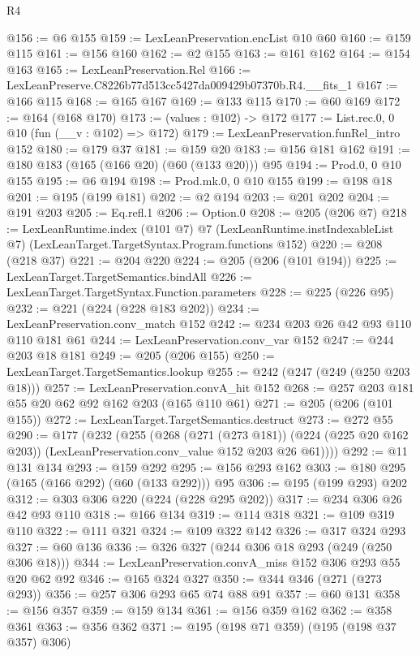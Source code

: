 \begin{lexlean}{R4}
\begin{coremodule}
@156 := @6 @155
@159 := LexLeanPreservation.encList @10 @60
@160 := @159 @115
@161 := @156 @160
@162 := @2 @155
@163 := @161 @162
@164 := @154 @163
@165 := LexLeanPreservation.Rel
@166 := LexLeanPreserve.C8226b77d513cc5427da009429b07370b.R4.__fits_1
@167 := @166 @115
@168 := @165 @167
@169 := @133 @115
@170 := @60 @169
@172 := @164 (@168 @170)
@173 := (values : @102) -> @172
@177 := List.rec.{0, 0} @10 (fun (__v : @102) => @172)
@179 := LexLeanPreservation.funRel_intro @152
@180 := @179 @37
@181 := @159 @20
@183 := @156 @181 @162
@191 := @180 @183 (@165 (@166 @20) (@60 (@133 @20))) @95
@194 := Prod.{0, 0} @10 @155
@195 := @6 @194
@198 := Prod.mk.{0, 0} @10 @155
@199 := @198 @18
@201 := @195 (@199 @181)
@202 := @2 @194
@203 := @201 @202
@204 := @191 @203
@205 := Eq.refl.{1}
@206 := Option.{0}
@208 := @205 (@206 @7)
@218 := LexLeanRuntime.index
    (@101 @7)
    @7
    (LexLeanRuntime.instIndexableList @7)
    (LexLeanTarget.TargetSyntax.Program.functions @152)
@220 := @208 (@218 @37)
@221 := @204 @220
@224 := @205 (@206 (@101 @194))
@225 := LexLeanTarget.TargetSemantics.bindAll
@226 := LexLeanTarget.TargetSyntax.Function.parameters
@228 := @225 (@226 @95)
@232 := @221 (@224 (@228 @183 @202))
@234 := LexLeanPreservation.conv_match @152
@242 := @234 @203 @26 @42 @93 @110 @110 @181 @61
@244 := LexLeanPreservation.conv_var @152
@247 := @244 @203 @18 @181
@249 := @205 (@206 @155)
@250 := LexLeanTarget.TargetSemantics.lookup
@255 := @242 (@247 (@249 (@250 @203 @18)))
@257 := LexLeanPreservation.convA_hit @152
@268 := @257 @203 @181 @55 @20 @62 @92 @162 @203 (@165 @110 @61)
@271 := @205 (@206 (@101 @155))
@272 := LexLeanTarget.TargetSemantics.destruct
@273 := @272 @55
@290 := @177
    (@232
      (@255
        (@268
          (@271 (@273 @181))
          (@224 (@225 @20 @162 @203))
          (LexLeanPreservation.conv_value @152 @203 @26 @61))))
@292 := @11 @131 @134
@293 := @159 @292
@295 := @156 @293 @162
@303 := @180 @295 (@165 (@166 @292) (@60 (@133 @292))) @95
@306 := @195 (@199 @293) @202
@312 := @303 @306 @220 (@224 (@228 @295 @202))
@317 := @234 @306 @26 @42 @93 @110
@318 := @166 @134
@319 := @114 @318
@321 := @109 @319 @110
@322 := @111 @321
@324 := @109 @322 @142
@326 := @317 @324 @293
@327 := @60 @136
@336 := @326 @327 (@244 @306 @18 @293 (@249 (@250 @306 @18)))
@344 := LexLeanPreservation.convA_miss @152 @306 @293 @55 @20 @62 @92
@346 := @165 @324 @327
@350 := @344 @346 (@271 (@273 @293))
@356 := @257 @306 @293 @65 @74 @88 @91
@357 := @60 @131
@358 := @156 @357
@359 := @159 @134
@361 := @156 @359 @162
@362 := @358 @361
@363 := @356 @362
@371 := @195 (@198 @71 @359) (@195 (@198 @37 @357) @306)

\end{coremodule}
\end{lexlean}
